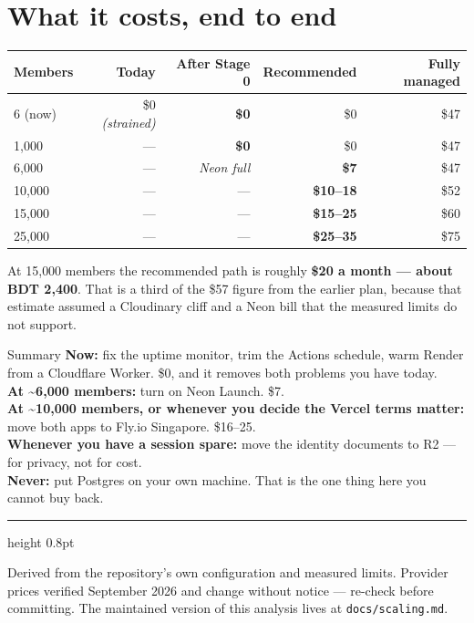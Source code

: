 \documentclass[11pt,a4paper]{article}
\newcommand{\hd}[1]{\textbf{\sffamily\small #1}}
\begin{document}
\section{What it costs, end to end}

\begin{center}
\begin{tabular}{@{}lrrrr@{}}
\toprule
\hd{Members} & \hd{Today} & \hd{After Stage 0} & \hd{Recommended} & \hd{Fully managed} \\
\midrule
6 (now) & \$0 \textit{(strained)} & \textbf{\$0} & \$0 & \$47 \\
1{,}000 & --- & \textbf{\$0} & \$0 & \$47 \\
6{,}000 & --- & \textit{Neon full} & \textbf{\$7} & \$47 \\
10{,}000 & --- & --- & \textbf{\$10--18} & \$52 \\
15{,}000 & --- & --- & \textbf{\$15--25} & \$60 \\
25{,}000 & --- & --- & \textbf{\$25--35} & \$75 \\
\bottomrule
\end{tabular}
\end{center}

At 15{,}000 members the recommended path is roughly \textbf{\$20 a month --- about BDT 2,400}. That is a third of the \$57 figure from the earlier plan, because that estimate assumed a Cloudinary cliff and a Neon bill that the measured limits do not support.

\begin{keybox}{Summary}
\textbf{Now:} fix the uptime monitor, trim the Actions schedule, warm Render from a Cloudflare Worker. \$0, and it removes both problems you have today.\\[3pt]
\textbf{At \textasciitilde6{,}000 members:} turn on Neon Launch. \$7.\\[3pt]
\textbf{At \textasciitilde10{,}000 members, or whenever you decide the Vercel terms matter:} move both apps to Fly.io Singapore. \$16--25.\\[3pt]
\textbf{Whenever you have a session spare:} move the identity documents to R2 --- for privacy, not for cost.\\[3pt]
\textbf{Never:} put Postgres on your own machine. That is the one thing here you cannot buy back.
\end{keybox}

\vspace{8pt}
\textcolor{rule}{\hrule height 0.8pt}
\vspace{4pt}
{\footnotesize\color{slate}\sffamily Derived from the repository's own configuration and measured limits. Provider prices verified September 2026 and change without notice --- re-check before committing. The maintained version of this analysis lives at \texttt{docs/scaling.md}.}
\end{document}
